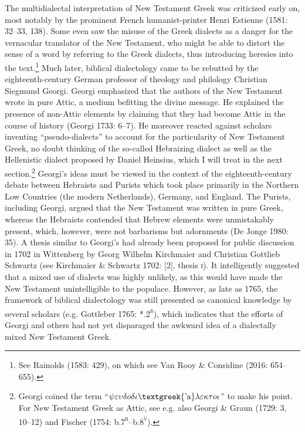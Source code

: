 \begin{styleStandard}
The multidialectal interpretation of New Testament Greek was criticized early on, most notably by the prominent French humanist-printer Henri Estienne (1581: 32–33, 138). Some even saw the misuse of the Greek dialects as a danger for the vernacular translator of the New Testament, who might be able to distort the sense of a word by referring to the Greek dialects, thus introducing heresies into the text.\footnote{ See Rainolds (1583: 429), on which see Van Rooy \& Considine (2016: 654–655).} Much later, biblical dialectology came to be rebutted by the eighteenth-century German professor of theology and philology Christian Siegmund Georgi. Georgi emphasized that the authors of the New Testament wrote in pure Attic, a medium befitting the divine message. He explained the presence of non-Attic elements by claiming that they had become Attic in the course of history (Georgi 1733: 6–7). He moreover reacted against scholars inventing “pseudo-dialects” to account for the particularity of New Testament Greek, no doubt thinking of the so-called Hebraizing dialect as well as the Hellenistic dialect proposed by Daniel Heinsius, which I will treat in the next section.\footnote{ Georgi coined the term “$\psi \varepsilon \upsilon \delta o\delta \iota \text{\textgreek{'a}}\lambda \varepsilon \kappa \tau o\iota $” to make his point. For New Testament Greek as Attic, see e.g. also Georgi \& Graun (1729: 3, 10–12) and Fischer (1754: b.7\textsc{\textsuperscript{r}}–b.8\textsc{\textsuperscript{v}}).} Georgi’s ideas must be viewed in the context of the eighteenth-century debate between Hebraists and Purists which took place primarily in the Northern Low Countries (the modern Netherlands), Germany, and England. The Purists, including Georgi, argued that the New Testament was written in pure Greek, whereas the Hebraists contended that Hebrew elements were unmistakably present, which, however, were not barbarisms but adornments (De Jonge 1980: 35). A thesis similar to Georgi’s had already been proposed for public discussion in 1702 in Wittenberg by Georg Wilhelm Kirchmaier and Christian Gottlieb Schwartz (see Kirchmaier \& Schwartz 1702: [2], thesis \textsc{i}). It intelligently suggested that a mixed use of dialects was highly unlikely, as this would have made the New Testament unintelligible to the populace. However, as late as 1765, the framework of biblical dialectology was still presented as canonical knowledge by several scholars (e.g. Gottleber 1765: *.2\textsc{\textsuperscript{r}}), which indicates that the efforts of Georgi and others had not yet disparaged the awkward idea of a dialectally mixed New Testament Greek.
\end{styleStandard}


